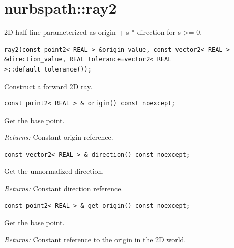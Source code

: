\section{nurbspath::ray2}
2D half-line parameterized as origin + s * direction for s >= 0.
\par\noindent\begin{minipage}{\linewidth}
\begin{lstlisting}[style=apireference]
ray2(const point2< REAL > &origin_value, const vector2< REAL > &direction_value, REAL tolerance=vector2< REAL >::default_tolerance());
\end{lstlisting}
{\footnotesize Construct a forward 2D ray.\par}
\end{minipage}\par\vspace{1pt}
\par\noindent\begin{minipage}{\linewidth}
\begin{lstlisting}[style=apireference]
const point2< REAL > & origin() const noexcept;
\end{lstlisting}
{\footnotesize Get the base point.\par}
{\footnotesize\textit{Returns:} Constant origin reference.\par}
\end{minipage}\par\vspace{1pt}
\par\noindent\begin{minipage}{\linewidth}
\begin{lstlisting}[style=apireference]
const vector2< REAL > & direction() const noexcept;
\end{lstlisting}
{\footnotesize Get the unnormalized direction.\par}
{\footnotesize\textit{Returns:} Constant direction reference.\par}
\end{minipage}\par\vspace{1pt}
\par\noindent\begin{minipage}{\linewidth}
\begin{lstlisting}[style=apireference]
const point2< REAL > & get_origin() const noexcept;
\end{lstlisting}
{\footnotesize Get the base point.\par}
{\footnotesize\textit{Returns:} Constant reference to the origin in the 2D world.\par}
\end{minipage}\par\vspace{1pt}
